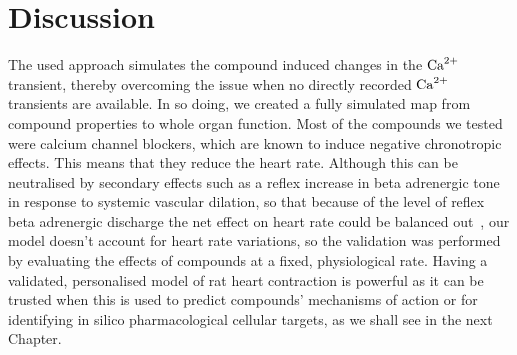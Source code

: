 \section{Discussion}\label{sec:ch6discussion}
The used approach simulates the compound induced changes in the $\textrm{Ca}^{2+}$ transient, thereby overcoming the issue when no directly recorded $\textrm{Ca}^{2+}$ transients are available. In so doing, we created a fully simulated map from compound properties to whole organ function.  Most of the compounds we tested were calcium channel blockers, which are known to induce negative chronotropic effects. This means that they reduce the heart rate. Although this can be neutralised by secondary effects such as a reflex increase in beta adrenergic tone in response to systemic vascular dilation, so that because of the level of reflex beta adrenergic discharge the net effect on heart rate could be balanced out~\cite{Low:1982}, our model doesn't account for heart rate variations, so the validation was performed by evaluating the effects of compounds at a fixed, physiological rate.  Having a validated, personalised model of rat heart contraction is powerful as it can be trusted when this is used to predict compounds' mechanisms of action or for identifying in silico pharmacological cellular targets, as we shall see in the next Chapter.